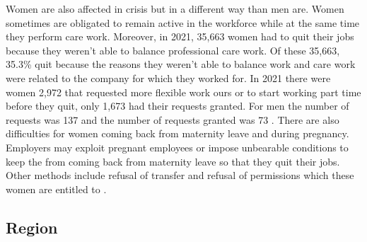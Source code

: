 \documentclass[12pt]{article}
\begin{document}
\begin{spacing}{1.5}
Women are also affected in crisis but in a different way than men are. Women sometimes are obligated to remain active in the workforce while at the same time they perform care work. Moreover, in 2021, 35,663 women had to quit their jobs because they weren't able to balance professional care work. Of these 35,663, 35.3\% quit because the reasons they weren't able to balance work and care work were related to the company for which they worked for. In 2021 there were women 2,972 that requested more flexible work ours or to start working part time before they quit, only 1,673 had their requests granted. For men the number of requests was 137 and the number of requests granted was 73 \cite{del2022relazione}. There are also difficulties for women coming back from maternity leave and during pregnancy. Employers may exploit pregnant employees or impose unbearable conditions to keep the from coming back from maternity leave so that they quit their jobs. Other methods include refusal of transfer and refusal of permissions which these women are entitled to \cite{toffanin2018donne}.

\end{spacing}

\subsection{Region}
\end{document}
